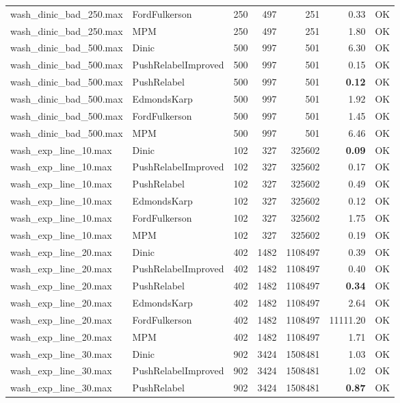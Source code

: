 \begin{longtable}{llrrrrl}
wash\_dinic\_bad\_250.max & FordFulkerson & 250 & 497 & 251 & 0.33 & OK \\
wash\_dinic\_bad\_250.max & MPM & 250 & 497 & 251 & 1.80 & OK \\
\midrule
wash\_dinic\_bad\_500.max & Dinic & 500 & 997 & 501 & 6.30 & OK \\
wash\_dinic\_bad\_500.max & PushRelabelImproved & 500 & 997 & 501 & 0.15 & OK \\
wash\_dinic\_bad\_500.max & PushRelabel & 500 & 997 & 501 & \textbf{0.12} & OK \\
wash\_dinic\_bad\_500.max & EdmondsKarp & 500 & 997 & 501 & 1.92 & OK \\
wash\_dinic\_bad\_500.max & FordFulkerson & 500 & 997 & 501 & 1.45 & OK \\
wash\_dinic\_bad\_500.max & MPM & 500 & 997 & 501 & 6.46 & OK \\
\midrule
wash\_exp\_line\_10.max & Dinic & 102 & 327 & 325602 & \textbf{0.09} & OK \\
wash\_exp\_line\_10.max & PushRelabelImproved & 102 & 327 & 325602 & 0.17 & OK \\
wash\_exp\_line\_10.max & PushRelabel & 102 & 327 & 325602 & 0.49 & OK \\
wash\_exp\_line\_10.max & EdmondsKarp & 102 & 327 & 325602 & 0.12 & OK \\
wash\_exp\_line\_10.max & FordFulkerson & 102 & 327 & 325602 & 1.75 & OK \\
wash\_exp\_line\_10.max & MPM & 102 & 327 & 325602 & 0.19 & OK \\
\midrule
wash\_exp\_line\_20.max & Dinic & 402 & 1482 & 1108497 & 0.39 & OK \\
wash\_exp\_line\_20.max & PushRelabelImproved & 402 & 1482 & 1108497 & 0.40 & OK \\
wash\_exp\_line\_20.max & PushRelabel & 402 & 1482 & 1108497 & \textbf{0.34} & OK \\
wash\_exp\_line\_20.max & EdmondsKarp & 402 & 1482 & 1108497 & 2.64 & OK \\
wash\_exp\_line\_20.max & FordFulkerson & 402 & 1482 & 1108497 & 11111.20 & OK \\
wash\_exp\_line\_20.max & MPM & 402 & 1482 & 1108497 & 1.71 & OK \\
\midrule
wash\_exp\_line\_30.max & Dinic & 902 & 3424 & 1508481 & 1.03 & OK \\
wash\_exp\_line\_30.max & PushRelabelImproved & 902 & 3424 & 1508481 & 1.02 & OK \\
wash\_exp\_line\_30.max & PushRelabel & 902 & 3424 & 1508481 & \textbf{0.87} & OK \\

\end{longtable}
